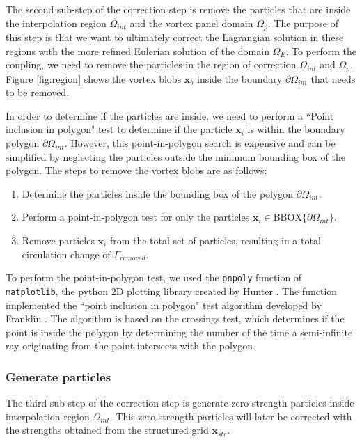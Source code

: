 The second sub-step of the correction step is remove the particles that are inside the interpolation region $\Omega_{int}$ and the vortex panel domain $\Omega_p$. The purpose of this step is that we want to ultimately correct the Lagrangian solution in these regions with the more refined Eulerian solution of the domain $\Omega_E$. To perform the coupling, we need to remove the particles in the region of correction $\Omega_{int}$ and $\Omega_p$. Figure \ref{fig:region} shows the vortex blobs $\mathbf{x}_b$ inside the boundary $\partial \Omega_{int}$ that needs to be removed. 

In order to determine if the particles are inside, we need to perform a ``Point inclusion in polygon" test to determine if the particle $\mathbf{x}_i$ is within the boundary polygon $\partial \Omega_{int}$. However, this point-in-polygon search is expensive and can be simplified by neglecting the particles outside the minimum bounding box of the polygon. The steps to remove the vortex blobs are as follows:
\begin{enumerate}
\item Determine the particles inside the bounding box of the polygon $\partial \Omega_{int}$. 
\item Perform a point-in-polygon test for only the particles $\mathbf{x}_i \in \mathrm{BBOX}\{\partial \Omega_{int}\}$.
\item Remove particles $\mathbf{x}_i$ from the total set of particles, resulting in a total circulation change of $\Gamma_{removed}$.
\end{enumerate}

To perform the point-in-polygon test, we used the \texttt{pnpoly} function of \texttt{matplotlib}, the python 2D plotting library created by Hunter \cite{Hunter:2007}. The function implemented the ``point inclusion in polygon" test algorithm developed by Franklin \cite{franklin2006pnpoly}. The algorithm is based on the crossings test, which determines if the point is inside the polygon by determining the number of the time a semi-infinite ray originating from the point intersects with the polygon.

\subsubsection*{Generate particles}

The third sub-step of the correction step is generate zero-strength particles inside interpolation region $\Omega_{int}$. This zero-strength particles will later be corrected with the strengths obtained from the structured grid $\mathbf{x}_{str}$.

